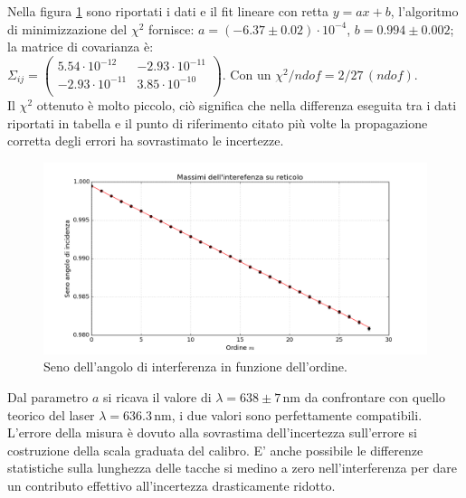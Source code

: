 \documentclass[10pt,a4paper]{article}
\begin{document}
Nella figura \ref{interferenza} sono riportati i dati e il fit lineare con retta $y = ax+b$, l'algoritmo di minimizzazione del $\chi^2$ fornisce: $a = ( -6.37 \pm 0.02 ) \cdot 10^{-4}$, $b = 0.994 \pm 0.002$; la matrice di covarianza è:\\ $ \Sigma_{ij} = \left( \begin{array}{cc}
5.54 \cdot 10^{-12} & -2.93 \cdot 10^{-11} \\ 
-2.93 \cdot 10^{-11} & 3.85 \cdot 10^{-10}\\
\end{array} \right)$. Con un $\chi^2/ndof = 2/27 \, (ndof)$.\\
Il $\chi^2$ ottenuto è molto piccolo, ciò significa che nella differenza eseguita tra i dati riportati in tabella e il punto di riferimento citato più volte la propagazione corretta degli errori ha sovrastimato le incertezze.\\


\begin{figure}[!htb]
  \centering
  \includegraphics[scale=.5]{plot.png}
\caption{Seno dell'angolo di interferenza in funzione dell'ordine.}
\label{interferenza}
\end{figure}

Dal parametro $a$ si ricava il valore di $\lambda = 638 \pm 7 \, \mbox{nm}$ da confrontare con quello teorico del laser $\lambda = 636.3 \, \mbox{nm}$, i due valori sono perfettamente compatibili. L'errore della misura è dovuto alla sovrastima dell'incertezza sull'errore si costruzione della scala graduata del calibro. E' anche possibile le differenze statistiche sulla lunghezza delle tacche si medino a zero nell'interferenza per dare un contributo effettivo all'incertezza drasticamente ridotto.\\
\end{document}
